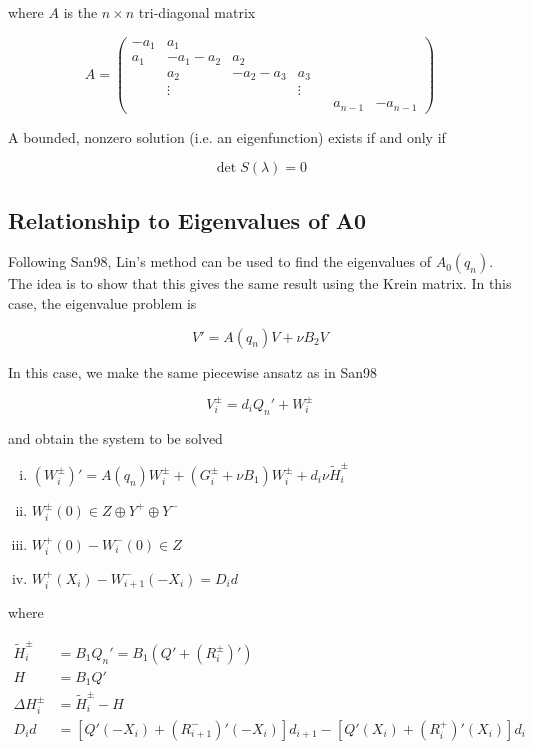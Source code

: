 \documentclass[12pt]{article}
\begin{document}
where $A$ is the $n\times n$ tri-diagonal matrix

\begin{equation}
A = \begin{pmatrix}
-a_1 & a_1 \\
a_1 & -a_1 - a_2 & a_2 \\
& a_2 & -a_2 - a_3 & a_3 \\
& \vdots & & \vdots \\
& & & & & a_{n-1} & -a_{n-1}
\end{pmatrix}
\end{equation}

A bounded, nonzero solution (i.e. an eigenfunction) exists if and only if 

\begin{equation}
\det S(\lambda) = 0
\end{equation}

\subsection{Relationship to Eigenvalues of A0}

Following San98, Lin's method can be used to find the eigenvalues of $A_0(q_n)$. The idea is to show that this gives the same result using the Krein matrix. In this case, the eigenvalue problem is 

\begin{equation}\label{A0evp}
V' = A(q_n)V + \nu B_2 V
\end{equation}

In this case, we make the same piecewise ansatz as in San98

\begin{equation}
V_i^\pm = d_i Q_n' + W_i^\pm
\end{equation}

and obtain the system to be solved

\begin{enumerate}[(i)]
\item $(W_i^\pm)' = A(q_n) W_i^\pm + (G_i^\pm + \nu B_1) W_i^\pm 
+ d_i \nu \tilde{H}_i^\pm$
\item $W_i^\pm(0) \in Z \oplus Y^+ \oplus Y^-$
\item $W_i^+(0) - W_i^-(0) \in Z$
\item $W_i^+(X_i) - W_{i+1}^-(-X_i) = D_i d$
\end{enumerate}

where

\begin{align*}
\tilde{H}_i^\pm &= B_1 Q_n' = B_1 (Q' + (R_i^\pm)') \\
H &= B_1 Q' \\
\Delta H_i^\pm &= \tilde{H}_i^\pm - H \\
D_i d &= [Q'(-X_i) + (R_{i+1}^-)'(-X_i)]d_{i+1} - [Q'(X_i) + (R_i^+)'(X_i)]d_i
\end{align*}
\end{document}
